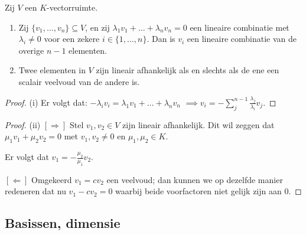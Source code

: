 \begin{lemma}[2.3.6]
    Zij $V$ een $K$-vectorruimte.
    \begin{enumerate}
        \item[(i)] Zij $\{v_1, \dots, v_n\} \subseteq V$, en zij $\lambda_1 v_1 + \dots + \lambda_n v_n = 0$ een lineaire combinatie met $\lambda_i \neq 0$ voor een zekere $i \in \{1, \dots, n\}$. Dan is $v_i$ een lineaire combinatie van de overige $n - 1$ elementen.
        \item[(ii)] Twee elementen in $V$ zijn lineair afhankelijk als en slechts als de ene een scalair veelvoud van de andere is.
    \end{enumerate}
\end{lemma}
\begin{proof}(i)
    Er volgt dat: \(-\lambda_i v_i = \lambda_1 v_1 + ... +\lambda_n v_n\)
    \(\implies v_i = -\sum_{j}^{n-1} \frac{\lambda_j}{\lambda_i} v_j  \).
\end{proof}
\begin{proof}(ii)
    \([\Rightarrow]\) Stel \(v_1,v_2 \in V\) zijn lineair afhankelijk.
    Dit wil zeggen dat \(\mu_1 v_1 + \mu_2 v_2 = 0\) met \(v_1, v_2 \neq 0\) en \(\mu_1, \mu_2 \in K\).

    Er volgt dat \(v_1 = -\frac{\mu_2}{\mu_1}v_2\).
    
    \([\Leftarrow]\) Omgekeerd \(v_1 = c v_2\) een veelvoud;
    dan kunnen we op dezelfde manier redeneren dat nu \(v_1 - c v_2 = 0\) waarbij beide voorfactoren niet gelijk zijn aan 0.
\end{proof}

\subsection{Basissen, dimensie}

